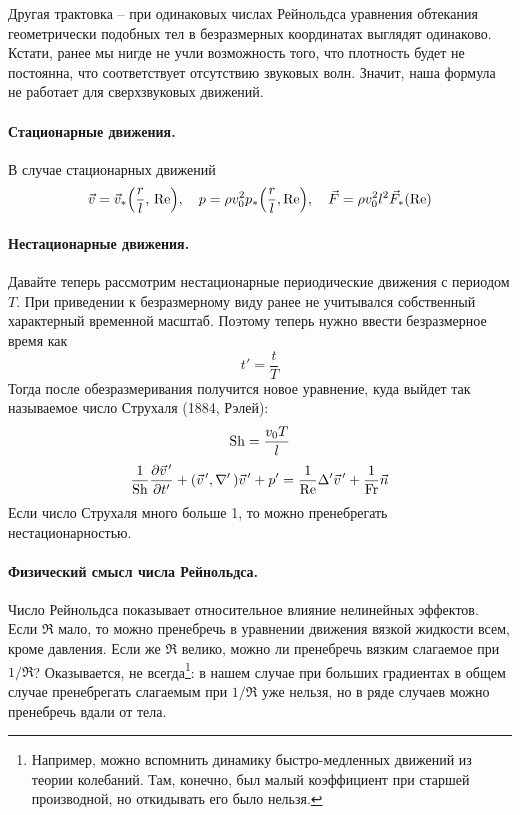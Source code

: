 Другая трактовка -- при одинаковых числах Рейнольдса уравнения обтекания геометрически подобных тел в безразмерных координатах выглядят одинаково.
Кстати, ранее мы нигде не учли возможность того, что плотность будет не постоянна, что соответствует отсутствию звуковых волн. Значит, наша формула не работает для сверхзвуковых движений.

\paragraph{Стационарные движения. } В случае стационарных движений
\begin{equation}
	\label{eq:zamech1}
    \vec{v}=\vec{v}_* \qty(\frac{r}{l},\, \Re), \quad
    p = \rho v_0^2 p_* \qty(\frac{r}{l}, \Re), \quad
    \vec{F} = \rho v_0^2 l^2 \vec{F}_* (\Re) 
\end{equation}

\paragraph{Нестационарные движения. } Давайте теперь рассмотрим нестационарные периодические движения с периодом $T$. При приведении к безразмерному виду ранее не  учитывался собственный характерный временной масштаб. Поэтому теперь нужно ввести безразмерное время как
\begin{equation}
    t'=\frac{t}{T}
\end{equation}
Тогда после обезразмеривания получится новое уравнение, куда выйдет так называемое число Струхаля (1884, Рэлей):
\begin{equation}
    \operatorname{Sh} = \frac{v_0 T}{l}
\end{equation}
\begin{equation}
    \frac{1}{\Sh}\pdv{\pvec{v}'}{t'}+(\pvec{v}', \nabla'\,)\pvec{v}' + p'=
    \frac{1}{\Re}\Delta' \pvec{v}' + \frac{1}{\Fr} \vec{n}
\end{equation}
Если число Струхаля много больше 1, то можно пренебрегать нестационарностью. 

\paragraph{Физический смысл числа Рейнольдса. } Число Рейнольдса показывает относительное влияние нелинейных эффектов. 
Если $\Re$ мало, то можно пренебречь в уравнении движения вязкой жидкости всем, кроме давления. %
Если же $\Re$ велико, можно ли пренебречь вязким слагаемое при $1/\Re$? Оказывается, не всегда\footnote{Например, можно вспомнить динамику быстро-медленных движений из теории колебаний. Там, конечно, был малый коэффициент при старшей производной, но откидывать его было нельзя.}:
в нашем случае при больших градиентах в общем случае пренебрегать слагаемым при $1/\Re$ уже нельзя, но в ряде случаев можно пренебречь вдали от тела.

